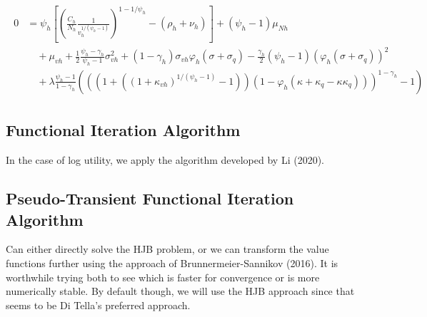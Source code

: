 \documentclass[12 pt, oneside]{article}
\theoremstyle{definition}
\theoremstyle{definition}
\theoremstyle{definition}
\begin{document}
\begin{align}
\begin{split}
  \end{split}\\
  \begin{split}
   0 & = \psi_h\left[\left(\frac{C_h}{N_h}\frac{1}{v_h^{1 / (\psi_h - 1)}}  \right)^{1 - 1 / \psi_h} - (\rho_h + \nu_h)\right]+  (\psi_h - 1)\mu_{Nh}\\
& \quad+ \mu_{vh} + \frac{1}{2}\frac{\psi_h - \gamma_h}{\psi_h - 1}\sigma_{vh}^2   + (1 - \gamma_h)\sigma_{vh}\varphi_h(\sigma + \sigma_q) - \frac{\gamma_h}{2}(\psi_h - 1) (\varphi_h(\sigma + \sigma_q))^2  \\
&\quad + \lambda\frac{\psi_h - 1}{1 - \gamma_h}(((1 +  ((1 + \kappa_{vh})^{1 / (\psi_h - 1)} - 1))(1 - \varphi_h(\kappa + \kappa_q - \kappa\kappa_q)))^{1 - \gamma_h} - 1)
  \end{split}
\end{align}


\subsection{Functional Iteration Algorithm}
In the case of log utility, we apply the algorithm developed by Li (2020).


\subsection{Pseudo-Transient Functional Iteration Algorithm}



Can either directly solve the HJB problem, or we can transform the value functions further using the approach of Brunnermeier-Sannikov (2016). It is worthwhile trying both to see which is faster for convergence or is more numerically stable. By default though, we will use the HJB approach since that seems to be Di Tella's preferred approach.
\end{document}
